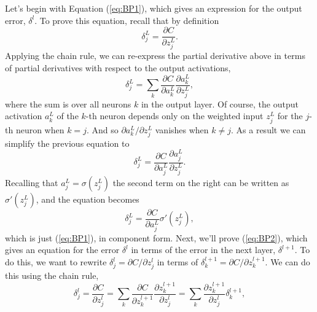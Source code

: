\documentclass[a4paper,twoside,10pt]{book}
\begin{document}
Let's begin with Equation (\ref{eq:BP1}), which gives an expression for the output error, $\delta^l$. To prove this equation, recall that by definition
\begin{equation}
	\delta^L_j = \frac{\partial C}{\partial z^L_j}.
	\label{eq:36}
\end{equation}
Applying the chain rule, we can re-express the partial derivative above in terms of partial derivatives with respect to the output activations,
\begin{equation}
	\delta^L_j = \sum_k \frac{\partial C}{\partial a^L_k} \frac{\partial a^L_k}{\partial z^L_j},
	\label{eq:37}
\end{equation}%
where the sum is over all neurons $k$ in the output layer. Of course, the output activation $a^L_k$ of the $k$-th neuron depends only on the weighted input $z^L_j$ for the $j$-th neuron when $k=j$. And so $\partial{}a^L_k/\partial{}z^L_j$ vanishes when $k\ne{}j$. As a result we can simplify the previous equation to
\begin{equation}
	\delta^L_j = \frac{\partial C}{\partial a^L_j} \frac{\partial a^L_j}{\partial z^L_j}.
	\label{eq:38}
\end{equation}%
Recalling that $a^L_j=\sigma(z^L_j)$ the second term on the right can be written as $\sigma'(z^L_j)$, and the equation becomes
\begin{equation}
	\delta^L_j = \frac{\partial C}{\partial a^L_j} \sigma'(z^L_j),
	\label{eq:39}
\end{equation}
which is just (\ref{eq:BP1}), in component form.
%
Next, we'll prove (\ref{eq:BP2}), which gives an equation for the error $\delta^l$ in terms of the error in the next layer, $\delta^{l+1}$. To do this, we want to rewrite $\delta^l_j=\partial{}C/\partial{}z^l_j$ in terms of $\delta^{l+1}_k=\partial{}C/\partial{}z^{l+1}_k$. We can do this using the chain rule,
\begin{equation}
\delta^l_j =  \frac{\partial C}{\partial z^l_j} =  \sum_k \frac{\partial C}{\partial z^{l+1}_k} \frac{\partial z^{l+1}_k}{\partial z^l_j} = \sum_k \frac{\partial z^{l+1}_k}{\partial z^l_j} \delta^{l+1}_k,
\label{eq:42}
\end{equation}
\end{document}
